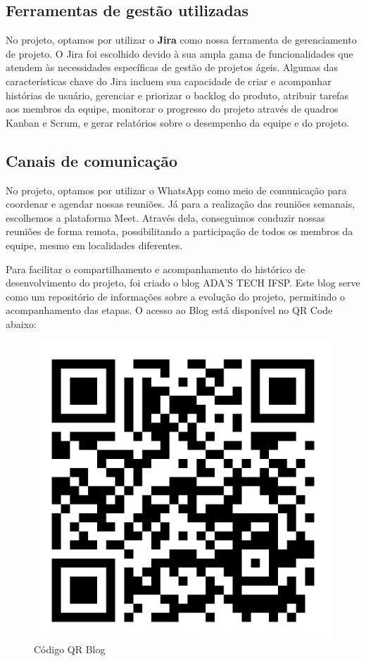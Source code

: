 \subsection{Ferramentas de gestão utilizadas}

No projeto, optamos por utilizar o \textbf{Jira} como nossa ferramenta de gerenciamento de projeto. O Jira foi escolhido devido à sua ampla gama de funcionalidades que atendem às necessidades específicas de gestão de projetos ágeis. Algumas das características chave do Jira incluem sua capacidade de criar e acompanhar histórias de usuário, gerenciar e priorizar o backlog do produto, atribuir tarefas aos membros da equipe, monitorar o progresso do projeto através de quadros Kanban e Scrum, e gerar relatórios sobre o desempenho da equipe e do projeto.

\subsection{Canais de comunicação}

No projeto, optamos por utilizar o WhatsApp como meio de comunicação para coordenar e agendar nossas reuniões. Já para a realização das reuniões semanais, escolhemos a plataforma Meet. Através dela, conseguimos conduzir nossas reuniões de forma remota, possibilitando a participação de todos os membros da equipe, mesmo em localidades diferentes.

Para facilitar o compartilhamento e acompanhamento do histórico de desenvolvimento do projeto, foi criado o blog ADA'S TECH IFSP. Este blog serve como um repositório de informações sobre a evolução do projeto, permitindo o acompanhamento das etapas. O acesso ao Blog está disponível no QR Code abaixo:

\begin{figure}[ht]
        \centering
        \includegraphics[scale=0.5]{qrCode-blog.png}
        \caption{Código QR Blog}
        \label{fig:enter-label}
    \end{figure}


